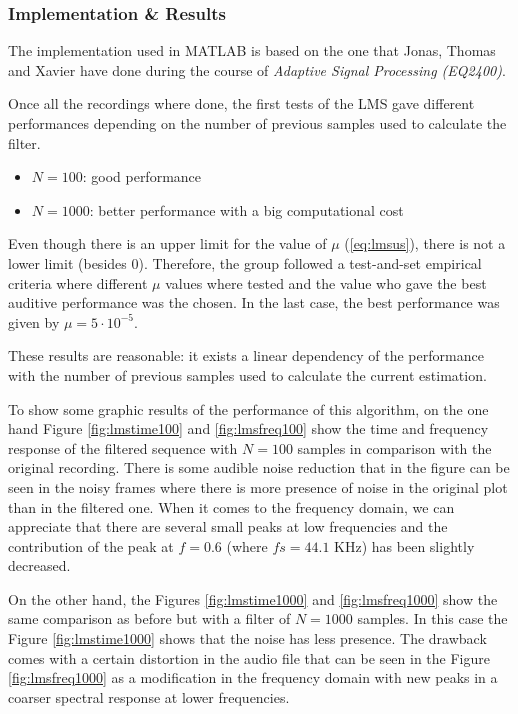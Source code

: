 \documentclass[11pt,a4paper,spanish]{book}  %
\theoremstyle{definition}  %
\theoremstyle{plain}  %
\theoremstyle{remark}  %
\begin{document}
	
	\subsubsection{Implementation \& Results}
	
	The implementation used in MATLAB is based on the one that Jonas, Thomas and Xavier have done during the course of \textit{Adaptive Signal Processing (EQ2400)}.
	
	Once all the recordings where done, the first tests of the LMS gave different performances depending on the number of previous samples used to calculate the filter.
	
	\begin{itemize}
	\item $N=100$: good performance
	\item $N=1000$: better performance with a big computational cost
	\end{itemize}
	
	Even though there is an upper limit for the value of $\mu$ (\ref{eq:lmsus}), there is not a lower limit (besides $0$). Therefore, the group followed a test-and-set empirical criteria where different $\mu$ values where tested and the value who gave the best auditive performance was the chosen. In the last case, the best performance was given by $\mu=5 \cdot 10^{-5}.$
	
	These results are reasonable: it exists a linear dependency of the performance with the number of previous samples used to calculate the current estimation.
	
	To show some graphic results of the performance of this algorithm, on the one hand Figure \ref{fig:lmstime100} and \ref{fig:lmsfreq100} show the time and frequency response of the filtered sequence with $N=100$ samples in comparison with the original recording. There is some audible noise reduction that in the figure can be seen in the noisy frames where there is more presence of noise in the original plot than in the filtered one. When it comes to the frequency domain, we can appreciate that there are several small peaks at low frequencies and the contribution of the peak at $f=0.6$ (where $fs=44.1$ KHz) has been slightly decreased.
	
	On the other hand,  the Figures \ref{fig:lmstime1000} and \ref{fig:lmsfreq1000} show the same comparison as before but with a filter of $N=1000$ samples. In this case the Figure \ref{fig:lmstime1000} shows that the noise has less presence. The drawback comes with a certain distortion in the audio file that can be seen in the Figure \ref{fig:lmsfreq1000} as a modification in the frequency domain with new peaks in a coarser spectral response at lower frequencies.
	
\end{document}
